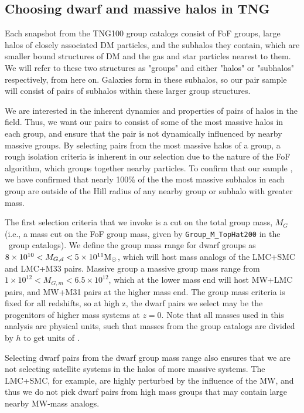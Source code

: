 \documentclass[twocolumn]{aastex631}
\begin{document}
    \subsection{Choosing dwarf and massive halos in TNG} \label{sec:methods-halos}
    Each snapshot from the TNG100 group catalogs consist of FoF groups, large halos of closely associated DM particles, and the subhalos they contain, which are smaller bound structures of DM and the gas and star particles nearest to them. 
    We will refer to these two structures as "groups" and either "halos" or "subhalos" respectively, from here on. 
    Galaxies form in these subhalos, so our pair sample will consist of pairs of subhalos within these larger group structures.

    We are interested in the inherent dynamics and properties of pairs of halos in the field.
    Thus, we want our pairs to consist of some of the most massive halos in each group, and ensure that the pair is not dynamically influenced by nearby massive groups. 
    By selecting pairs from the most massive halos of a group, a rough isolation criteria is inherent in our selection due to the nature of the FoF algorithm, which groups together nearby particles. 
    To confirm that our sample , we have confirmed that nearly 100\% of the the most massive subhalos in each group are outside of the Hill radius of any nearby group or subhalo with greater mass.

    The first selection criteria that we invoke is a cut on the total group mass, $M_{G}$ (i.e., a mass cut on the FoF group mass, given by \texttt{Group\_M\_TopHat200} in the \tng\ group catalogs). 
    We define the group mass range for dwarf groups as $8\times 10^{10} < M_{G,d} < 5\times 10^{11}\mathrm{M}_\odot$, which will host mass analogs of the LMC+SMC and LMC+M33 pairs. 
    Massive group a massive group mass range from $1\times10^{12} < M_{G,m} < 6.5\times10^{12}$, which at the lower mass end will host MW+LMC pairs, and MW+M31 pairs at the higher mass end. 
    The group mass criteria is fixed for all redshifts, so at high z, the dwarf pairs we select may be the progenitors of higher mass systems at $z=0$.
    Note that all masses used in this analysis are physical units, such that masses from the group catalogs are divided by $h$ to get units of \Msun. 

    Selecting dwarf pairs from the dwarf group mass range also ensures that we are not selecting satellite systems in the halos of more massive systems. 
    The LMC+SMC, for example, are highly perturbed by the influence of the MW, and thus we do not pick dwarf pairs from high mass groups that may contain large nearby MW-mass analogs.
    
\end{document}
